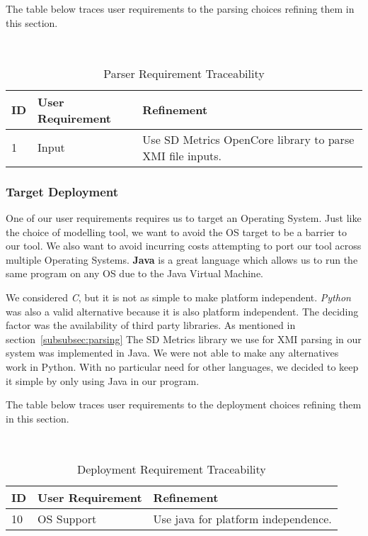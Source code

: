    The table below traces user requirements to the parsing choices refining them in this section.
    \begin{table}[htbp]
        \centering
        \caption{Parser Requirement Traceability}\label{tab:parse-choice-table}\\
        \begin{tabularx}{\textwidth}{| l | l | X |}
            \hline
            \textbf{ID} & \textbf{User Requirement} & \textbf{Refinement} \\
            \hline
            1 & Input & Use SD Metrics OpenCore library to parse XMI file inputs. \\ \hline
        \end{tabularx}
    \end{table}

    \newpage
    \subsubsection{Target Deployment}
    One of our user requirements requires us to target an Operating System.
    Just like the choice of modelling tool, we want to avoid the OS target to be a barrier to our tool.
    We also want to avoid incurring costs attempting to port our tool across multiple Operating Systems.
    \textbf{Java} is a great language which allows us to run the same program on any OS due to the Java Virtual Machine.

    We considered \textit{C}, but it is not as simple to make platform independent.
    \textit{Python} was also a valid alternative because it is also platform independent.
    The deciding factor was the availability of third party libraries.
    As mentioned in section~\ref{subsubsec:parsing} The SD Metrics library we use for XMI parsing in our system was implemented in Java.
    We were not able to make any alternatives work in Python.
    With no particular need for other languages, we decided to keep it simple by only using Java in our program.

    The table below traces user requirements to the deployment choices refining them in this section.
    \begin{table}[htbp]
        \centering
        \caption{Deployment Requirement Traceability}\label{tab:os-choice-table}\\
        \begin{tabularx}{\textwidth}{| l | l | X |}
            \hline
            \textbf{ID} & \textbf{User Requirement} & \textbf{Refinement} \\
            \hline
            10 & OS Support & Use java for platform independence. \\ \hline
        \end{tabularx}
    \end{table}

